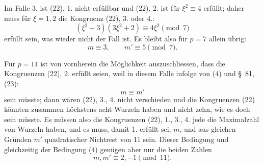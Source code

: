 \documentclass[11pt]{article}
\begin{document}
Im Falle 3. ist (22), 1. nicht erfüllbar und (22), 2. ist für $\xi^2\equiv4$ erfüllt; daher muss für $\xi=1,2$ die Kongruenz (22), 3. oder 4.:
\[
 (\xi^2+3)(3\xi^2+2)\equiv4\xi^2\pmod7
\]
erfüllt sein, was wieder nicht der Fall ist. Es bleibt also für $p=7$ allein übrig:
\begin{equation}
 m\equiv3,\qquad m'\equiv5\pmod7.
\tag{5}
\end{equation}

Für $p=11$ ist von vornherein die Möglichkeit auszuschliessen, dass die Kongruenzen (22), 2. erfüllt seien, weil in diesem Falle infolge von (4) und \S~81, (23):
\[
 m\equiv m'
\]
sein müsste; dann wären (22), 3., 4. nicht verschieden und die Kongruenzen (22) könnten zusammen höchstens acht Wurzeln haben und nicht zehn, wie es doch sein müsste. Es müssen also die Kongruenzen (22), 1., 3., 4. jede die Maximalzahl von Wurzeln haben, und es muss, damit 1. erfüllt sei, $m$, und aus gleichen Gründen $m'$ quadratischer Nichtrest von 11 sein. Dieser Bedingung und gleichzeitig der Bedingung (4) genügen aber nur die beiden Zahlen
\begin{equation}
 m,m'\equiv2,-1\pmod {11}.
\tag{6}
\end{equation}
\end{document}
